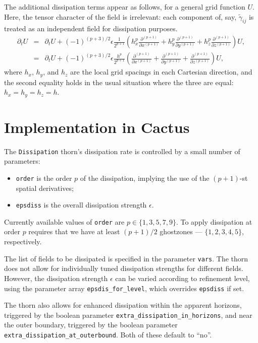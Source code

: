 The additional dissipation terms appear as follows, for a general grid function $U$. Here, the
tensor character of the field is irrelevant: each component of, say, $\tilde{\gamma}_{ij}$ is
treated as an independent field for dissipation purposes.
%
\begin{eqnarray*}
\partial_t U &=& \partial_t U + (-1)^{(p+3)/2} \epsilon \frac{1}{2^{p+1}} \left( h_x^{p} \frac{\partial^{(p+1)}}{\partial x^{(p+1)}} + h_y^{p} \frac{\partial^{(p+1)}}{\partial y^{(p+1)}} +
h_z^{p} \frac{\partial^{(p+1)}}{\partial z^{(p+1)}}\right) U, \\
             &=& \partial_t U + (-1)^{(p+3)/2} \epsilon \frac{h^{p}}{2^{p+1}} \left( \frac{\partial^{(p+1)}}{\partial x^{(p+1)}} + \frac{\partial^{(p+1)}}{\partial y^{(p+1)}} +
\frac{\partial^{(p+1)}}{\partial z^{(p+1)}}\right) U,
\end{eqnarray*}
%
where $h_x$, $h_y$, and $h_z$ are the local grid spacings in each Cartesian direction, and the
second equality holds in the usual situation where the three are equal: $h_x = h_y = h_z = h$.

\section{Implementation in Cactus}

The \texttt{Dissipation} thorn's dissipation rate is controlled by a small number of parameters:
%
\begin{itemize}
  \item \texttt{order} is the order $p$ of the dissipation, implying the use of the $(p+1)$-st spatial derivatives;
  \item \texttt{epsdiss} is the overall dissipation strength $\epsilon$.
\end{itemize}

Currently available values of \texttt{order} are $p \in \{1, 3, 5, 7, 9\}$. To apply dissipation at
order $p$ requires that we have at least $(p+1)/2$ ghostzones --- $\{1, 2, 3, 4, 5\}$, respectively.

The list of fields to be dissipated is specified in the parameter \texttt{vars}. The thorn does
not allow for individually tuned dissipation strengths for different fields. However, the
dissipation strength $\epsilon$ can be varied according to refinement level, using the parameter
array \texttt{epsdis\_for\_level}, which overrides \texttt{epsdiss} if set.

The thorn also allows for enhanced dissipation within the apparent horizons, triggered by the
boolean parameter \texttt{extra\_dissipation\_in\_horizons}, and near the outer boundary,
triggered by the boolean parameter \texttt{extra\_dissipation\_at\_outerbound}. Both of these
default to ``no''.

